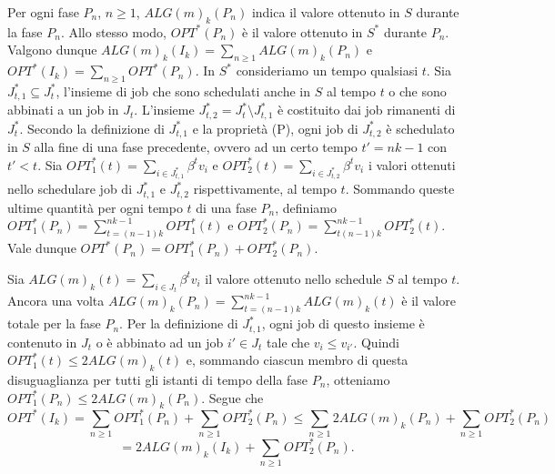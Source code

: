 \documentclass[12pt]{article}
\begin{document}
Per ogni fase $P_{n}$, $n \geq 1$, $ALG(m)_{k}(P_{n})$ indica il valore ottenuto in $S$ durante la fase $P_{n}$. Allo stesso modo, $OPT^{*}(P_{n})$ è il valore ottenuto in $S^{*}$ durante $P_{n}$. Valgono dunque $ALG(m)_{k}(I_{k}) =  \sum_{n \geq 1} ALG(m)_{k}(P_{n})$ e $OPT^{*}(I_{k}) = \sum_{n \geq 1} OPT^{*}(P_{n})$. In $S^{*}$ consideriamo un tempo qualsiasi $t$. Sia $J_{t,1}^{*} \subseteq J_{t}^{*}$, l'insieme di job che sono schedulati anche in $S$ al tempo $t$ o che sono abbinati a un job in $J_{t}$. L'insieme $J_{t,2}^{*} = J_{t}^{*}\setminus J_{t,1}^{*}$ è costituito dai job rimanenti di $J_{t}^{*}$. Secondo la definizione di $J_{t,1}^{*}$ e la proprietà (P), ogni job di $J_{t,2}^{*}$ è schedulato in $S$ alla fine di una fase precedente, ovvero ad un certo tempo $t' = nk - 1$ con $t' <t$. Sia $OPT^{*}_{1}(t) = \sum_{i \in J_{t,1}^{*}} \beta^{t}v_{i}$ e $OPT^{*}_{2}(t) = \sum_{i \in J_{t,2}^{*}} \beta^{t} v_{i}$ i valori ottenuti nello schedulare job di $J_{t,1}^{*}$ e $J_{t,2}^{*}$ rispettivamente, al tempo $t$. Sommando queste ultime quantità per ogni tempo $t$ di una fase $P_{n}$, definiamo $OPT^{*}_{1}(P_{n}) = \sum^{nk - 1}_{t = (n - 1) k} OPT^{*}_{1}(t)$ e $OPT^{*}_{2}(P_{n}) = \sum^{nk- 1}_{t (n - 1) k} OPT^{*}_{2}(t)$. Vale dunque $OPT^{*}(P_{n}) = OPT^{*}_{1}(P_{n}) + OPT^{*}_{2}(P_{n}).$

Sia $ALG(m)_{k}(t) = \sum_{i \in J_{t}} \beta^{t}v_{i}$ il valore ottenuto nello schedule $S$ al tempo $t$. Ancora una volta $ALG(m)_{k}(P_{n}) = \sum^{nk - 1}_{t = (n - 1) k}ALG(m)_{k}(t)$ è il valore totale per la fase $P_{n}$. Per la definizione di $J_{t,1}^{*}$, ogni job di questo insieme è contenuto in $J_{t}$ o è abbinato ad un job $i' \in J_{t}$ tale che $v_{i} \leq v_{i'}$. Quindi $OPT^{*}_{1}(t) \leq 2ALG(m)_{k}(t)$ e, sommando ciascun membro di questa disuguaglianza per tutti gli istanti di tempo della fase $P_{n}$, otteniamo $OPT^{*}_{1}(P_{n}) \leq 2ALG(m)_{k}(P_{n})$. Segue che 
$$OPT^{*}(I_{k}) = \sum_{n \geq 1} OPT^{*}_{1}(P_{n}) + \sum_{n \geq 1}OPT^{*}_{2}(P_{n}) \leq \sum_{n \geq 1} 2ALG(m)_{k}(P_{n}) + \sum_{n \geq 1} OPT^{*}_{2}(P_{n})$$ 
$$= 2ALG(m)_{k}(I_{k}) + \sum_{n \geq 1} OPT^{*}_{2}(P_{n}).$$
\end{document}
